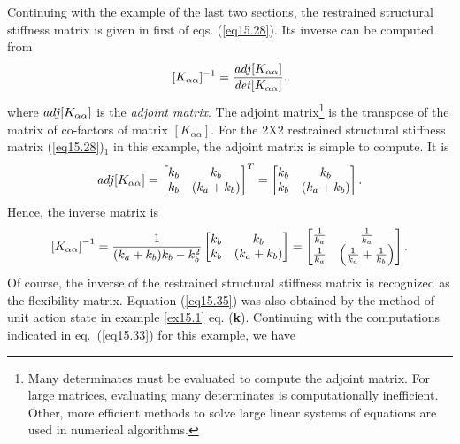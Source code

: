\documentclass{AeroStructure-ERJohnson}
\begin{document}
Continuing with the example of the last two sections, the restrained structural stiffness matrix is given in first of eqs. (\ref{eq15.28}). Its inverse can be computed from
\[
[K_{\alpha \alpha}]^{-1}=\frac{\operatorname{\it adj}[K_{\alpha \alpha}]}{\operatorname{\it det}[K_{\alpha \alpha}]}.
\]
where $\operatorname{\it adj}[K_{\alpha \alpha}]$ is the \textit{adjoint matrix}. The adjoint matrix\footnote{Many determinates must be evaluated to compute the adjoint matrix. For large matrices, evaluating many determinates is computationally inefficient. Other, more efficient methods to solve large linear systems of equations are used in numerical
algorithms.} is the transpose of the matrix of co-factors of matrix $[K_{\alpha \alpha}]$. For the 2X2 restrained structural stiffness matrix (\ref{eq15.28})$_1$ in this example, the adjoint matrix is simple to compute. It is
\begin{align}\label{eq15.34}
\operatorname{\it adj}[K_{\alpha \alpha}]=
\left[\begin{array}{@{}lc@{}}k_{b} & k_{b} \\ k_{b} & (k_{a}+k_{b})\end{array}\right]^{T}=\left[\begin{array}{@{}lc@{}}k_{b} & k_{b} \\ k_{b} & (k_{a}+k_{b})\end{array}\right].
\end{align}
Hence, the inverse matrix is
\begin{align}\label{eq15.35}
\left[K_{\alpha \alpha}\right]^{-1}=\frac{1}{(k_{a}+k_{b}) k_{b}-k_{b}^{2}}\left[\begin{array}{@{}cc@{}}k_{b} & k_{b} \\ k_{b} & (k_{a}+k_{b})\end{array}\right]=\left[\begin{array}{@{}cc@{}}\frac{1}{k_{a}} & \frac{1}{k_{a}} \\ \frac{1}{k_{a}} & \left(\frac{1}{k_{a}}+\frac{1}{k_{b}}\right)\end{array}\right].
\end{align}
Of course, the inverse of the restrained structural stiffness matrix is recognized as the flexibility matrix. Equation (\ref{eq15.35}) was also obtained by the method of unit action state in example \ref{ex15.1} eq. (\textbf{k}). Continuing with the computations indicated in eq.~(\ref{eq15.33}) for this example, we have
\end{document}
